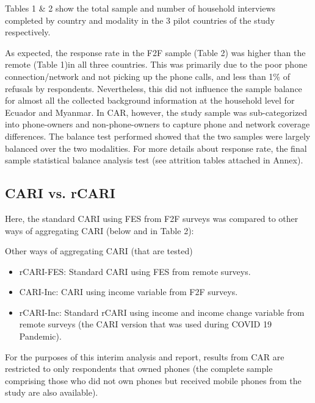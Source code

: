 \documentclass[11pt,harvard]{article}
\begin{document}
Tables 1 \& 2 show the total sample and number of household interviews completed by country and modality in the 3 pilot countries of the study respectively.

 
\label{tab:rCARI_Overall_Completion_F2F}

 
\label{tab:rCARI_Overall_Completion_R}

As expected, the response rate in the F2F sample (Table 2) was higher than the remote (Table 1)in all three countries. This was primarily due to the poor phone connection/network and not picking up the  phone calls, and less than 1\% of refusals by respondents. Nevertheless, this did not influence the sample balance for almost all the collected background information at the household level for Ecuador and Myanmar. 
In CAR, however, the study sample was sub-categorized into phone-owners and non-phone-owners to capture phone and network coverage differences. The balance test performed showed that the two samples were largely balanced over the two modalities. For more details about response rate, the final sample statistical balance analysis test (see attrition tables attached in Annex).

	
\subsection{CARI vs. rCARI}
	
Here, the standard CARI using FES from F2F surveys was compared to other ways of aggregating CARI (below and in Table 2):
	
	Other ways of aggregating CARI (that are tested)
	\begin{itemize}[label=--, left=1.5em]
		\item rCARI-FES: Standard CARI using FES from remote surveys.
		\item CARI-Inc: CARI using income variable from F2F surveys.
		\item rCARI-Inc: Standard rCARI using income and income change variable from remote surveys (the CARI version that was used during COVID 19 Pandemic).
	\end{itemize}
	
For the purposes of this interim analysis and report, results from  CAR are restricted to only respondents that owned phones (the complete sample comprising those who did not own phones but received mobile phones from the study are  also available).
	
\end{document}
